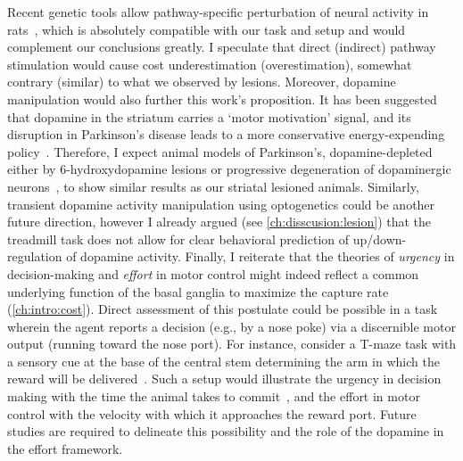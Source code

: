 Recent genetic tools allow pathway-specific perturbation of neural activity in rats~\cite{Pettibone2019eNeuro}, which is absolutely compatible with our task and setup and would complement our conclusions greatly.
I speculate that direct (indirect) pathway stimulation would cause cost underestimation (overestimation), somewhat contrary (similar) to what we observed by lesions.
Moreover, dopamine manipulation would also further this work's proposition.
It has been suggested that dopamine in the striatum carries a `motor motivation' signal, and its disruption in Parkinson's disease leads to a more conservative energy-expending policy~\cite{Mazzoni2007}.
Therefore, I expect animal models of Parkinson's, dopamine-depleted either by 6-hydroxydopamine lesions or progressive degeneration of dopaminergic neurons~\cite{Panigrahi2015Cell}, to show similar results as our striatal lesioned animals.
Similarly, transient dopamine activity manipulation using optogenetics could be another future direction, however I already argued (see \autoref{ch:disscusion:lesion}) that the treadmill task does not allow for clear behavioral prediction of up/down-regulation of dopamine activity.
Finally, I reiterate that the theories of \emph{urgency} in decision-making and \emph{effort} in motor control might indeed reflect a common underlying function of the basal ganglia to maximize the capture rate (\autoref{ch:intro:cost}).
Direct assessment of this postulate could be possible in a task wherein the agent reports a decision (e.g., by a nose poke) via a discernible motor output (running toward the nose port).
For instance, consider a T-maze task with a sensory cue at the base of the central stem determining the arm in which the reward will be delivered~\cite[i.e., a combination of][]{Zuo2019CurrBiol,Engelhard2019N}.
Such a setup would illustrate the urgency in decision making with the time the animal takes to commit~\cite{Thura2017Neruon}, and the effort in motor control with the velocity with which it approaches the reward port.
Future studies are required to delineate this possibility and the role of the dopamine in the effort framework.